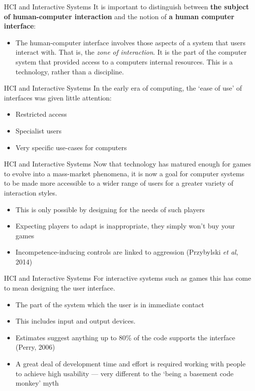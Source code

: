 \begin{frame}{HCI and Interactive Systems}
	It is important to distinguish between \textbf{the subject of human-computer interaction} and the notion of
	\textbf{a human computer interface}:
	
	\begin{itemize}
		\item The human-computer interface involves those aspects of a system that users interact with. That is,
		the \textit{zone of interaction}. It is the part of the computer system that provided access to a computers
		internal resources. This is a technology, rather than a discipline.
	\end{itemize}
\end{frame}

\begin{frame}{HCI and Interactive Systems}
	In the early era of computing, the `ease of use' of interfaces was given little attention:
	
	\begin{itemize}
		\item Restricted access
		\item Specialist users
		\item Very specific use-cases for computers
	\end{itemize}
\end{frame}

\begin{frame}{HCI and Interactive Systems}
	Now that technology has matured enough for games to evolve into a mass-market phenomena, it is now a goal for
	computer systems to be made more accessible to a wider range of users for a greater variety of interaction styles. 
	
	\begin{itemize}
		\item This is only possible by designing for the needs of such players
		\item Expecting players to adapt is inappropriate, they simply won't buy your games
		\item Incompetence-inducing controls are linked to aggression (Przybylski \textit{et al}, 2014)
	\end{itemize}
\end{frame}

\begin{frame}{HCI and Interactive Systems}
	For interactive systems such as games this has come to mean designing the user interface. 
	
	\begin{itemize}
		\item The part of the system which the user is in immediate contact
		\item This includes input and output devices.
		\item Estimates suggest anything up to 80\% of the code supports the interface (Perry, 2006)
		\item A great deal of development time and effort is required working with people to achieve high usability --- 
		very different to the `being a basement code monkey' myth
	\end{itemize}
\end{frame}


